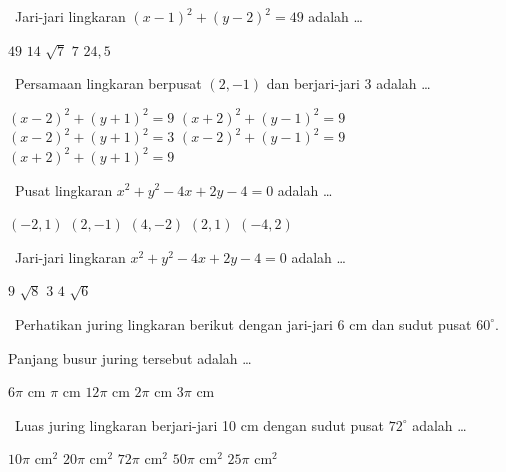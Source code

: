 \documentclass[11pt,a4paper]{exam}
\newcommand{\Fund}{{\footnotesize\textsf{\textcolor{hijau}{[Fundamental]}}}\ }
\newcommand{\Inter}{{\footnotesize\textsf{\textcolor{biru}{[Intermediate]}}}\ }
\newcommand{\Adv}{{\footnotesize\textsf{\textcolor{oranye}{[Advanced]}}}\ }
\begin{document}
\begin{questions}
\question \Fund Jari-jari lingkaran $(x-1)^{2}+(y-2)^{2}=49$ adalah \dots
\begin{choices}
\choice $49$ \choice $14$ \choice $\sqrt{7}$ \CorrectChoice $7$ \choice $24{,}5$
\end{choices}

\question \Inter Persamaan lingkaran berpusat $(2,-1)$ dan berjari-jari 3 adalah \dots
\begin{choices}
\CorrectChoice $(x-2)^{2}+(y+1)^{2}=9$
\choice $(x+2)^{2}+(y-1)^{2}=9$
\choice $(x-2)^{2}+(y+1)^{2}=3$
\choice $(x-2)^{2}+(y-1)^{2}=9$
\choice $(x+2)^{2}+(y+1)^{2}=9$
\end{choices}

\question \Inter Pusat lingkaran $x^{2}+y^{2}-4x+2y-4=0$ adalah \dots
\begin{choices}
\choice $(-2,1)$ \CorrectChoice $(2,-1)$ \choice $(4,-2)$ \choice $(2,1)$ \choice $(-4,2)$
\end{choices}

\question \Inter Jari-jari lingkaran $x^{2}+y^{2}-4x+2y-4=0$ adalah \dots
\begin{choices}
\choice $9$ \choice $\sqrt{8}$ \CorrectChoice $3$ \choice $4$ \choice $\sqrt{6}$
\end{choices}

\question \Inter Perhatikan juring lingkaran berikut dengan jari-jari 6 cm dan
sudut pusat $60^\circ$.

\begin{center}
\end{center}

Panjang busur juring tersebut adalah \dots
\begin{choices}
\choice $6\pi$ cm \choice $\pi$ cm \choice $12\pi$ cm \CorrectChoice $2\pi$ cm \choice $3\pi$ cm
\end{choices}

\question \Adv Luas juring lingkaran berjari-jari 10 cm dengan sudut pusat
$72^\circ$ adalah \dots
\begin{choices}
\choice $10\pi$ cm$^2$ \CorrectChoice $20\pi$ cm$^2$ \choice $72\pi$ cm$^2$
\choice $50\pi$ cm$^2$ \choice $25\pi$ cm$^2$
\end{choices}


\end{questions}
\end{document}
